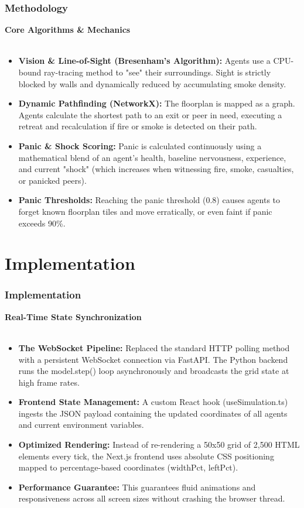 \documentclass{beamer}
\begin{document}
\begin{frame}
\frametitle{Methodology}
\textbf{Core Algorithms \& Mechanics} \\
\vspace{0.2cm}
\footnotesize 

\begin{itemize}
    \item \textbf{Vision \& Line-of-Sight (Bresenham's Algorithm):} Agents use a CPU-bound ray-tracing method to "see" their surroundings. Sight is strictly blocked by walls and dynamically reduced by accumulating smoke density.
    \item \textbf{Dynamic Pathfinding (NetworkX):} The floorplan is mapped as a graph. Agents calculate the shortest path to an exit or peer in need, executing a retreat and recalculation if fire or smoke is detected on their path.
    \item \textbf{Panic \& Shock Scoring:} Panic is calculated continuously using a mathematical blend of an agent's health, baseline nervousness, experience, and current "shock" (which increases when witnessing fire, smoke, casualties, or panicked peers).
    \item \textbf{Panic Thresholds:} Reaching the panic threshold (0.8) causes agents to forget known floorplan tiles and move erratically, or even faint if panic exceeds 90\%.
\end{itemize}
\end{frame}

\section{Implementation}

\begin{frame}
\frametitle{Implementation}
\textbf{Real-Time State Synchronization} \\
\vspace{0.2cm}
\footnotesize 

\begin{itemize}
    \item \textbf{The WebSocket Pipeline:} Replaced the standard HTTP polling method with a persistent WebSocket connection via FastAPI. The Python backend runs the model.step() loop asynchronously and broadcasts the grid state at high frame rates.
    \item \textbf{Frontend State Management:} A custom React hook (useSimulation.ts) ingests the JSON payload containing the updated coordinates of all agents and current environment variables.
    \item \textbf{Optimized Rendering:} Instead of re-rendering a 50x50 grid of 2,500 HTML elements every tick, the Next.js frontend uses absolute CSS positioning mapped to percentage-based coordinates (widthPct, leftPct).
    \item \textbf{Performance Guarantee:} This guarantees fluid animations and responsiveness across all screen sizes without crashing the browser thread.
\end{itemize}
\end{frame}
\end{document}
